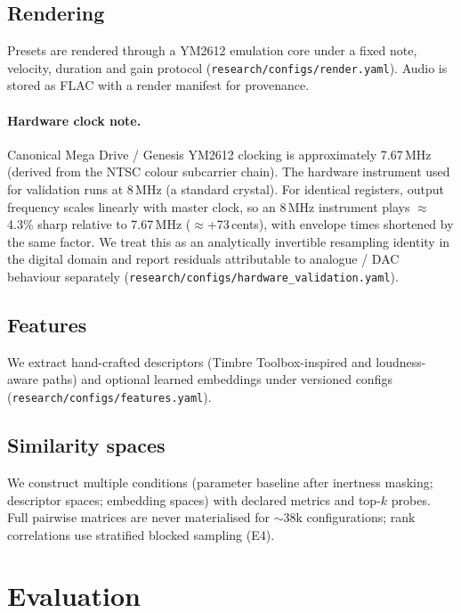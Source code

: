 \documentclass{article}
\begin{document}
\subsection{Rendering}
\label{sec:render}
Presets are rendered through a YM2612 emulation core under a fixed note,
velocity, duration and gain protocol
(\texttt{research/configs/render.yaml}).
Audio is stored as FLAC with a render manifest for provenance.

\paragraph{Hardware clock note.}
Canonical Mega Drive / Genesis YM2612 clocking is approximately
7.67\,MHz (derived from the NTSC colour subcarrier chain).
The hardware instrument used for validation runs at 8\,MHz (a standard crystal).
For identical registers, output frequency scales linearly with master clock, so
an 8\,MHz instrument plays $\approx$4.3\% sharp relative to 7.67\,MHz
($\approx$+73\,cents), with envelope times shortened by the same factor.
We treat this as an analytically invertible resampling identity in the digital
domain and report residuals attributable to analogue / DAC behaviour separately
(\texttt{research/configs/hardware\_validation.yaml}).

\subsection{Features}
\label{sec:features}
We extract hand-crafted descriptors (Timbre Toolbox-inspired and loudness-aware
paths) and optional learned embeddings under versioned configs
(\texttt{research/configs/features.yaml}).

\subsection{Similarity spaces}
\label{sec:spaces}
We construct multiple conditions (parameter baseline after inertness masking;
descriptor spaces; embedding spaces) with declared metrics and top-$k$ probes.
Full pairwise matrices are never materialised for $\sim$38k configurations;
rank correlations use stratified blocked sampling (E4).

\section{Evaluation}
\label{sec:eval}
\end{document}
